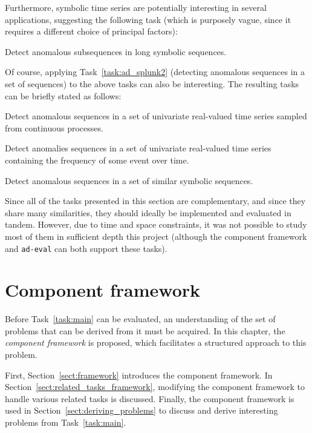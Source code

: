 Furthermore, symbolic time series are potentially interesting in several applications, suggesting the following task (which is purposely vague, since it requires a different choice of principal factors):

\begin{task}
  Detect anomalous subsequences in long symbolic sequences.
\end{task}

Of course, applying Task~\ref{task:ad_splunk2} (detecting anomalous sequences in a set of sequences) to the above tasks can also be interesting. The resulting tasks can be briefly stated as follows:

\begin{task}
  Detect anomalous sequences in a set of univariate real-valued time series sampled from continuous processes.
\end{task}

\begin{task}
  Detect anomalies sequences in a set of univariate real-valued time series containing the frequency of some event over time.
\end{task}

\begin{task}
  Detect anomalous sequences in a set of similar symbolic sequences.
\end{task}

Since all of the tasks presented in this section are complementary, and since they share many similarities, they should ideally be implemented and evaluated in tandem. However, due to time and space constraints, it was not possible to study most of them in sufficient depth this project (although the component framework and \texttt{ad-eval} can both support these tasks).

\section{Component framework}
\label{sect:component_framework}

Before Task~\ref{task:main} can be evaluated, an understanding of the set of problems that can be derived from it must be acquired. In this chapter, the \emph{component framework} is proposed, which facilitates a structured approach to this problem.

First, Section~\ref{sect:framework} introduces the component framework. In Section~\ref{sect:related_tasks_framework}, modifying the component framework to handle various related tasks is discussed. Finally, the component framework is used in Section~\ref{sect:deriving_problems} to discuss and derive interesting problems from Task~\ref{task:main}.

